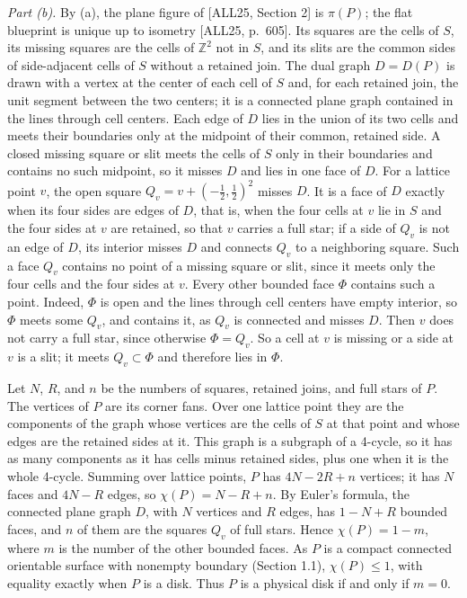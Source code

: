 \documentclass[
  11pt,
]{article}
\newcounter{none} %
\begin{document}
\emph{Part (b).} By (a), the plane figure of {[}ALL25, Section 2{]} is
\(\pi(P)\); the flat blueprint is unique up to isometry {[}ALL25,
p.~605{]}. Its squares are the cells of \(S\), its missing squares are
the cells of \(\mathbb Z^2\) not in \(S\), and its slits are the common
sides of side-adjacent cells of \(S\) without a retained join. The dual
graph \(D=D(P)\) is drawn with a vertex at the center of each cell of
\(S\) and, for each retained join, the unit segment between the two
centers; it is a connected plane graph contained in the lines through
cell centers. Each edge of \(D\) lies in the union of its two cells and
meets their boundaries only at the midpoint of their common, retained
side. A closed missing square or slit meets the cells of \(S\) only in
their boundaries and contains no such midpoint, so it misses \(D\) and
lies in one face of \(D\). For a lattice point \(v\), the open square
\(Q_v=v+(-\tfrac12,\tfrac12)^2\) misses \(D\). It is a face of \(D\)
exactly when its four sides are edges of \(D\), that is, when the four
cells at \(v\) lie in \(S\) and the four sides at \(v\) are retained, so
that \(v\) carries a full star; if a side of \(Q_v\) is not an edge of
\(D\), its interior misses \(D\) and connects \(Q_v\) to a neighboring
square. Such a face \(Q_v\) contains no point of a missing square or
slit, since it meets only the four cells and the four sides at \(v\).
Every other bounded face \(\Phi\) contains such a point. Indeed,
\(\Phi\) is open and the lines through cell centers have empty interior,
so \(\Phi\) meets some \(Q_v\), and contains it, as \(Q_v\) is connected
and misses \(D\). Then \(v\) does not carry a full star, since otherwise
\(\Phi=Q_v\). So a cell at \(v\) is missing or a side at \(v\) is a
slit; it meets \(Q_v\subset\Phi\) and therefore lies in \(\Phi\).

Let \(N\), \(R\), and \(n\) be the numbers of squares, retained joins,
and full stars of \(P\). The vertices of \(P\) are its corner fans. Over
one lattice point they are the components of the graph whose vertices
are the cells of \(S\) at that point and whose edges are the retained
sides at it. This graph is a subgraph of a 4-cycle, so it has as many
components as it has cells minus retained sides, plus one when it is the
whole 4-cycle. Summing over lattice points, \(P\) has \(4N-2R+n\)
vertices; it has \(N\) faces and \(4N-R\) edges, so \(\chi(P)=N-R+n\).
By Euler's formula, the connected plane graph \(D\), with \(N\) vertices
and \(R\) edges, has \(1-N+R\) bounded faces, and \(n\) of them are the
squares \(Q_v\) of full stars. Hence \(\chi(P)=1-m\), where \(m\) is the
number of the other bounded faces. As \(P\) is a compact connected
orientable surface with nonempty boundary (Section 1.1),
\(\chi(P)\leq1\), with equality exactly when \(P\) is a disk. Thus \(P\)
is a physical disk if and only if \(m=0\).
\end{document}
